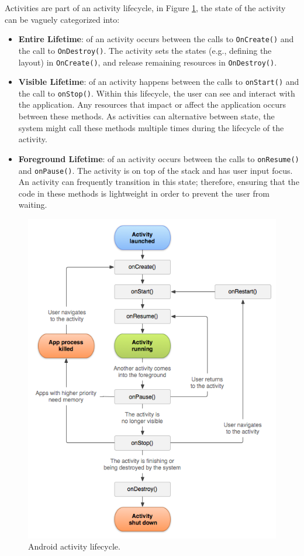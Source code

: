 Activities are part of an activity lifecycle, in Figure \ref{fig:lifecycle}, the state of the activity can be vaguely categorized into:
\begin{itemize}
    \item \textbf{Entire Lifetime}: of an activity occurs between the calls to \verb|OnCreate()| and the call to \verb|OnDestroy()|. The activity sets the states (e.g., defining the layout) in \verb|OnCreate()|, and release remaining resources in \verb|OnDestroy()|.
    \item \textbf{Visible Lifetime}: of an activity happens between the calls to \verb|onStart()| and the call to \verb|onStop()|. Within this lifecycle, the user can see and interact with the application. Any resources that impact or affect the application occurs between these methods. As activities can alternative between state, the system might call these methods multiple times during the lifecycle of the activity.
    \item \textbf{Foreground Lifetime}: of an activity occurs between the calls to \verb|onResume()| and \verb|onPause()|. The activity is on top of the stack and has user input focus. An activity can frequently transition in this state; therefore, ensuring that the code in these methods is lightweight in order to prevent the user from waiting. 
\end{itemize} 

\begin{figure}
    \centering
    \includegraphics[scale=0.6]{images/androidlifecycle.png}
    \caption{Android activity lifecycle.}
    \label{fig:lifecycle}
\end{figure}

